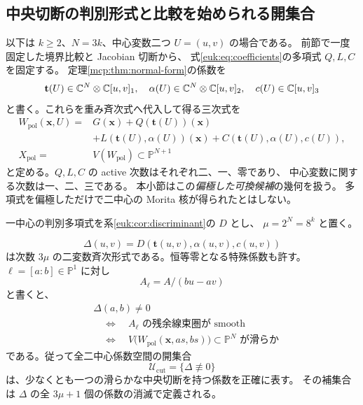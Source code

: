 \subsection{中央切断の判別形式と比較を始められる開集合}
\label{mcpn:subsec:pencil}

以下は $k\ge2$、$N=3k$、中心変数二つ $U=(u,v)$ の場合である。
前節で一度固定した境界比較と Jacobian 切断から、
式\eqref{euk:eq:coefficients}の多項式 $Q,L,C$ を固定する。
定理\ref{mcp:thm:normal-form}の係数を
\[
 \mathbf t(U)\in\mathbb C^N\otimes\mathbb C[u,v]_1,\quad
 \alpha(U)\in\mathbb C^N\otimes\mathbb C[u,v]_2,\quad c(U)\in\mathbb C[u,v]_3
\]
と書く。これらを重み斉次式へ代入して得る三次式を
\begin{equation}\label{mcpn:eq:polarized-candidate}
 \begin{split}
 W_{\mathrm{pol}}(\mathbf x,U)
  ={}&G(\mathbf x)+Q(\mathbf t(U))(\mathbf x)\\
    &+L(\mathbf t(U),\alpha(U))(\mathbf x)
      +C(\mathbf t(U),\alpha(U),c(U)),\\
 X_{\mathrm{pol}}={}&V(W_{\mathrm{pol}})\subset\mathbb P^{N+1}
 \end{split}
\end{equation}
と定める。$Q,L,C$ の active 次数はそれぞれ二、一、零であり、
中心変数に関する次数は一、二、三である。
本小節はこの\emph{偏極した可換候補}の幾何を扱う。
多項式を偏極しただけで二中心の Morita 核が得られたとはしない。

一中心の判別多項式を系\ref{euk:cor:discriminant}の $D$ とし、
$\mu=2^N=8^k$ と置く。

\begin{proposition}
\label{mcpn:prop:ray-discriminant}
\[
 \Delta(u,v)=D(\mathbf t(u,v),\alpha(u,v),c(u,v))
\]
は次数 $3\mu$ の二変数斉次形式である。恒等零となる特殊係数も許す。
$\ell=[a:b]\in\mathbb P^1$ に対し
\[
 A_\ell=A/(bu-av)
\]
と書くと、
\[
 \begin{aligned}
 &\Delta(a,b)\ne0\\
 &\quad\Longleftrightarrow\quad
 A_\ell\text{ の残余線束圏が smooth}\\
 &\quad\Longleftrightarrow\quad
 V\bigl(W_{\mathrm{pol}}(\mathbf x,as,bs)\bigr)
       \subset\mathbb P^N\text{ が滑らか}
 \end{aligned}
\]
である。従って全二中心係数空間の開集合
\[
 \mathcal U_{\mathrm{cut}}
   =\{\Delta\not\equiv0\}
\]
は、少なくとも一つの滑らかな中央切断を持つ係数を正確に表す。
その補集合は $\Delta$ の全 $3\mu+1$ 個の係数の消滅で定義される。
\end{proposition}

